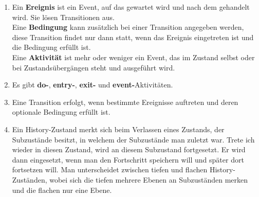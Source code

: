 \documentclass[a4paper, 12pt, margins=2.5cm]{homework}
\begin{document}
  \begin{problem}
    
  \end{problem}
  \begin{solution}\hfill
    \begin{enumerate}[label=\alph*)]\itemsep0pt
      \item Ein \textbf{Ereignis} ist ein Event, auf das gewartet wird und nach
            dem gehandelt wird. Sie lösen Transitionen aus. \\
            Eine \textbf{Bedingung} kann zusätzlich bei einer Transition angegeben
            werden, diese Transition findet nur dann statt, wenn das Ereignis 
            eingetreten ist und die Bedingung erfüllt ist. \\
            Eine \textbf{Aktivität} ist mehr oder weniger ein Event, das im Zustand
            selbst oder bei Zustandsübergängen steht und ausgeführt wird.

      \item Es gibt \textbf{do-}, \textbf{entry-}, \textbf{exit-} und \textbf{event-}Aktivitäten.
      \item Eine Transition erfolgt, wenn bestimmte Ereignisse auftreten und deren
            optionale Bedingung erfüllt ist.
      \item Ein History-Zustand merkt sich beim Verlassen eines Zustands, der 
            Subzustände besitzt, in welchem der Subzustände man zuletzt war. Trete
            ich wieder in diesen Zustand, wird an diesem Subzustand fortgesetzt. 
            Er wird dann eingesetzt, wenn man den Fortschritt speichern will und
            später dort fortsetzen will. Man unterscheidet zwischen tiefen und 
            flachen History-Zuständen, wobei sich die tiefen mehrere Ebenen an 
            Subzuständen merken und die flachen nur eine Ebene.
    \end{enumerate}
  \end{solution}
\end{document}
